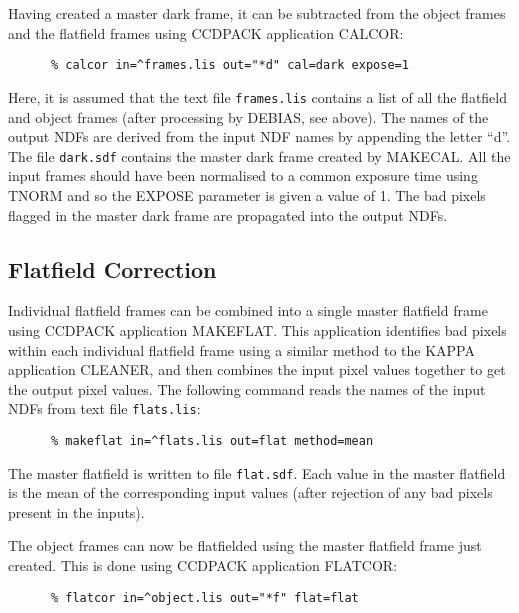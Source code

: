 Having created a master dark frame, it can be subtracted from the
object frames and the flatfield frames using {\small CCDPACK}
application {\small CALCOR}:

\small
\begin{verbatim}
      % calcor in=^frames.lis out="*d" cal=dark expose=1
\end{verbatim}
\normalsize

Here, it is assumed that the text file \verb+frames.lis+ contains a
list of all the flatfield and object frames (after processing by
{\small DEBIAS}, see above). The names of the output {\small NDF}s are
derived from the input {\small NDF} names by appending the letter
``d''. The file \verb+dark.sdf+ contains the master dark frame created
by {\small MAKECAL}. All the input frames should have been normalised
to a common exposure time using {\small TNORM} and so the {\small
EXPOSE} parameter is given a value of 1. The bad pixels flagged in the
master dark frame are propagated into the output {\small NDF}s.

\subsection{Flatfield Correction}
\label{SEC:FLAT}

Individual flatfield frames can be combined into a single master
flatfield frame using {\small CCDPACK} application {MAKEFLAT}. This
application identifies bad pixels within each individual flatfield
frame using a similar method to the {\small KAPPA} application {\small
CLEANER}, and then combines the input pixel values together to get the
output pixel values. The following command reads the names of the input
{\small NDF}s from text file \verb+flats.lis+:

\small
\begin{verbatim}
      % makeflat in=^flats.lis out=flat method=mean
\end{verbatim}
\normalsize

The master flatfield is written to file \verb+flat.sdf+. Each value in
the master flatfield is the mean of the corresponding input values
(after rejection of any bad pixels present in the inputs).

The object frames can now be flatfielded using the master flatfield
frame just created. This is done using {\small CCDPACK} application
{\small FLATCOR}:

\small
\begin{verbatim}
      % flatcor in=^object.lis out="*f" flat=flat
\end{verbatim}
\normalsize

